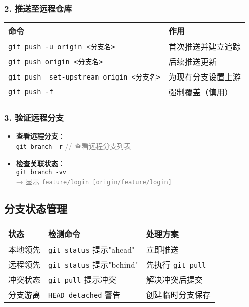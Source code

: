 \subsubsection{2. 推送至远程仓库}
\begin{center}
\begin{tabular}{@{}ll@{}}
    \toprule
    \textbf{命令} & \textbf{作用} \\
    \midrule
    \texttt{git push -u origin <分支名>} & 首次推送并建立追踪 \\
    \texttt{git push origin <分支名>} & 后续推送更新 \\
    \texttt{git push --set-upstream origin <分支名>} & 为现有分支设置上游 \\
    \texttt{git push -f} & 强制覆盖（慎用） \\
    \bottomrule
\end{tabular}
\end{center}

\subsubsection{3. 验证远程分支}
\begin{itemize}[leftmargin=*, nosep]
    \item \textbf{查看远程分支}：\\
    \texttt{git branch -r} \quad \textcolor{gray}{// 查看远程分支列表}
    
    \item \textbf{检查关联状态}：\\
    \texttt{git branch -vv} \\
    \textcolor{gray}{→ 显示 \texttt{feature/login [origin/feature/login]}}
\end{itemize}

\subsection{分支状态管理}
\begin{center}
\begin{tabular}{@{}llp{8cm}@{}}
    \toprule
    \textbf{状态} & \textbf{检测命令} & \textbf{处理方案} \\
    \midrule
    本地领先 & \texttt{git status} 提示"ahead" & 立即推送 \\
    远程领先 & \texttt{git status} 提示"behind" & 先执行 \texttt{git pull} \\
    冲突状态 & \texttt{git pull} 提示冲突 & 解决冲突后提交 \\
    分支游离 & \texttt{HEAD detached} 警告 & 创建临时分支保存 \\
    \bottomrule
\end{tabular}
\end{center}


